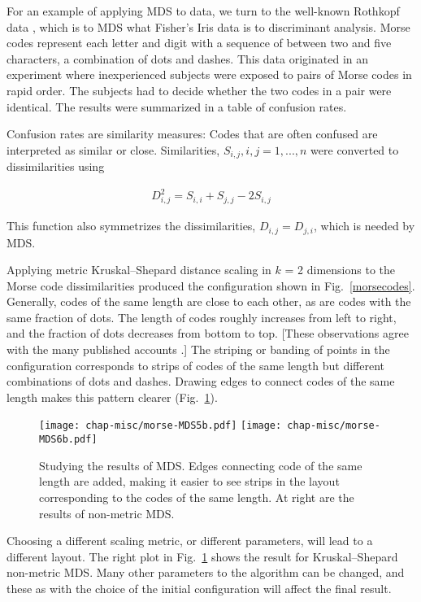  For an example of
applying MDS to data, we turn to the well-known Rothkopf  data \cite{Ro1957}, which is to MDS what
Fisher's Iris data is to discriminant analysis. Morse codes represent
each letter and digit with a sequence of between two and five
characters, a combination of dots and dashes.  This data originated in
an experiment where inexperienced subjects were exposed to pairs of
Morse codes in rapid order. The subjects had to decide whether the two
codes in a pair were identical. The results were summarized in a table
of confusion rates.

Confusion rates are similarity measures: Codes that are often confused
are interpreted as similar or close. Similarities, $S_{i,j}, i,j=1,
..., n$ were converted to dissimilarities using

\begin{eqnarray*}
D_{i,j} ^ 2 = S_{i,i} + S_{j,j} - 2S_{i,j}
\end{eqnarray*}

\noindent This function also symmetrizes the dissimilarities, 
$D_{i,j}=D_{j,i}$, which is needed by MDS.


Applying metric Kruskal--Shepard distance scaling in $k$ = 2 dimensions
to the Morse code dissimilarities produced the configuration shown in
Fig.~\ref{morsecodes}.  Generally, codes of the same length are close
to each other, as are codes with the same fraction of dots.  The
length of codes roughly increases from left to right, and the fraction
of dots decreases from bottom to top. [These observations agree with
the many published accounts \cite{Sh62,KW78,BG05}.] The striping or
banding of points in the configuration corresponds to strips of codes
of the same length but different combinations of dots and
dashes. Drawing edges to connect codes of the same length makes this
pattern clearer (Fig.~\ref{morsecodes2}).

\begin{figure}[htbp]
\centerline{
  \texttt{[image: chap-misc/morse-MDS5b.pdf]}
  \texttt{[image: chap-misc/morse-MDS6b.pdf]}
}
\caption[Studying MDS results]
{Studying the results of MDS. Edges connecting code of the same length
are added, making it easier to see strips in the layout corresponding
to the codes of the same length. At right are the results of
non-metric MDS.  }
\label{morsecodes2}
\end{figure}

Choosing a different scaling metric, or different parameters, will
lead to a different layout. The right plot in Fig.~\ref{morsecodes2}
shows the result for Kruskal--Shepard non-metric MDS. Many other
parameters to the algorithm can be changed, and these as with the
choice of the initial configuration will affect the final result.

